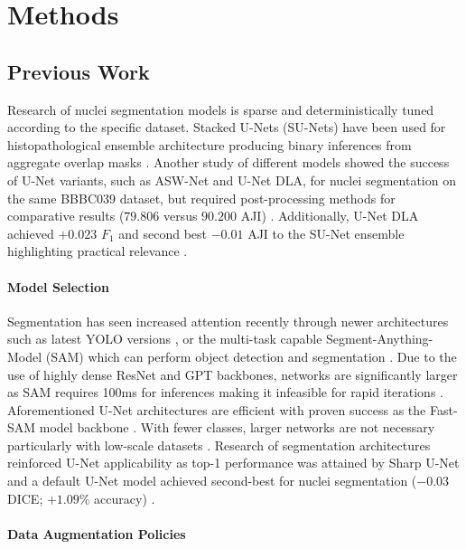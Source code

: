 \section{Methods}

\subsection{Previous Work}

Research of nuclei segmentation models is sparse and deterministically tuned according to the specific dataset. Stacked U-Nets (SU-Nets) have been used for histopathological ensemble architecture producing binary inferences from aggregate overlap masks \cite{UNetNuclei}. Another study of different models showed the success of U-Net variants, such as ASW-Net and U-Net DLA, for nuclei segmentation on the same BBBC039 dataset, but required post-processing methods for comparative results ($79.806$ versus $90.200$ AJI) \cite{BBBC039ResearchStudy}. Additionally, U-Net DLA achieved $+0.023$ $F_1$ and second best $-0.01$ AJI to the SU-Net ensemble highlighting practical relevance \cite{BBBC039ResearchStudy}.

\paragraph*{Model Selection}

Segmentation has seen increased attention recently through newer architectures such as latest YOLO versions \cite{YOLOv8}, or the multi-task capable Segment-Anything-Model (SAM) which can perform object detection and segmentation \cite{SAM}. Due to the use of highly dense ResNet and GPT backbones, networks are significantly larger as SAM requires 100ms for inferences making it infeasible for rapid iterations \cite{SAM}. Aforementioned U-Net architectures are efficient with proven success as the Fast-SAM model backbone \cite{FastSAM}. With fewer classes, larger networks are not necessary particularly with low-scale datasets \cite{FastSAM,BBBC039ResearchStudy}. Research of segmentation architectures reinforced U-Net applicability as top-1 performance was attained by Sharp U-Net and a default U-Net model achieved second-best for nuclei segmentation ($-0.03$ DICE; $+1.09\%$ accuracy) \cite{SegmentationSurvey}.

\paragraph*{Data Augmentation Policies}

